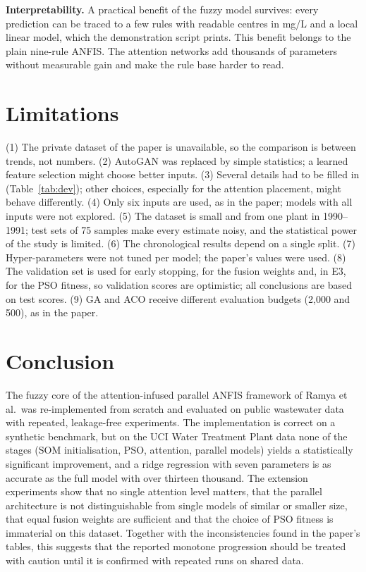 \documentclass[conference]{IEEEtran}
\begin{document}
\textbf{Interpretability.} A practical benefit of the fuzzy model survives: every prediction can be traced to a few rules with readable centres in mg/L and a local linear model, which the demonstration script prints. This benefit belongs to the plain nine-rule ANFIS. The attention networks add thousands of parameters without measurable gain and make the rule base harder to read.

\section{Limitations}
(1) The private dataset of the paper is unavailable, so the comparison is between trends, not numbers. (2) AutoGAN was replaced by simple statistics; a learned feature selection might choose better inputs. (3) Several details had to be filled in (Table~\ref{tab:dev}); other choices, especially for the attention placement, might behave differently. (4) Only six inputs are used, as in the paper; models with all inputs were not explored. (5) The dataset is small and from one plant in 1990--1991; test sets of 75 samples make every estimate noisy, and the statistical power of the study is limited. (6) The chronological results depend on a single split. (7) Hyper-parameters were not tuned per model; the paper's values were used. (8) The validation set is used for early stopping, for the fusion weights and, in E3, for the PSO fitness, so validation scores are optimistic; all conclusions are based on test scores. (9) GA and ACO receive different evaluation budgets (2,000 and 500), as in the paper.

\section{Conclusion}
The fuzzy core of the attention-infused parallel ANFIS framework of Ramya et al.\ was re-implemented from scratch and evaluated on public wastewater data with repeated, leakage-free experiments. The implementation is correct on a synthetic benchmark, but on the UCI Water Treatment Plant data none of the stages (SOM initialisation, PSO, attention, parallel models) yields a statistically significant improvement, and a ridge regression with seven parameters is as accurate as the full model with over thirteen thousand. The extension experiments show that no single attention level matters, that the parallel architecture is not distinguishable from single models of similar or smaller size, that equal fusion weights are sufficient and that the choice of PSO fitness is immaterial on this dataset. Together with the inconsistencies found in the paper's tables, this suggests that the reported monotone progression should be treated with caution until it is confirmed with repeated runs on shared data.
\end{document}
